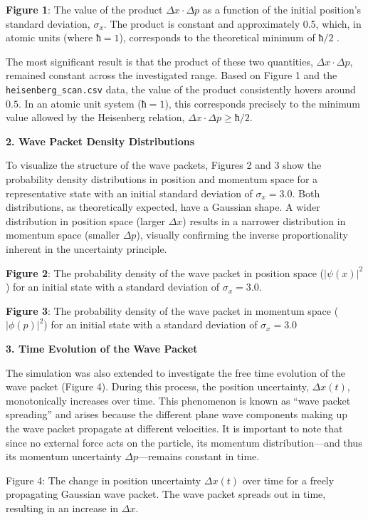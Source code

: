 \textbf{Figure 1}: The value of the product \(Δx·Δp\) as a function of
the initial position's standard deviation, \(σ_x\). The product is
constant and approximately 0.5, which, in atomic units (where \(ħ=1\)),
corresponds to the theoretical minimum of \(ħ/2\) .

The most significant result is that the product of these two quantities,
\(Δx·Δp\), remained constant across the investigated range. Based on
Figure 1 and the \texttt{heisenberg\_scan.csv} data, the value of the
product consistently hovers around \(0.5\). In an atomic unit system
(\(ħ=1\)), this corresponds precisely to the minimum value allowed by
the Heisenberg relation, \(Δx·Δp ≥ ħ/2\).

\textbf{2. Wave Packet Density Distributions}

To visualize the structure of the wave packets, Figures 2 and 3 show the
probability density distributions in position and momentum space for a
representative state with an initial standard deviation of
\(σ_x = 3.0\). Both distributions, as theoretically expected, have a
Gaussian shape. A wider distribution in position space (larger \(Δx\))
results in a narrower distribution in momentum space (smaller \(Δp\)),
visually confirming the inverse proportionality inherent in the
uncertainty principle.

\textbf{Figure 2}: The probability density of the wave packet in
position space (\(|\psi(x)|^2\)) for an initial state with a standard
deviation of \(σ_x = 3.0\).

\textbf{Figure 3}: The probability density of the wave packet in
momentum space (\(|\phi(p)|^2\)) for an initial state with a standard
deviation of \(σ_x = 3.0\)

\textbf{3. Time Evolution of the Wave Packet}

The simulation was also extended to investigate the free time evolution
of the wave packet (Figure 4). During this process, the position
uncertainty, \(Δx(t)\), monotonically increases over time. This
phenomenon is known as ``wave packet spreading'' and arises because the
different plane wave components making up the wave packet propagate at
different velocities. It is important to note that since no external
force acts on the particle, its momentum distribution---and thus its
momentum uncertainty \(Δp\)---remains constant in time.

Figure 4: The change in position uncertainty \(Δx(t)\) over time for a
freely propagating Gaussian wave packet. The wave packet spreads out in
time, resulting in an increase in \(Δx\).

